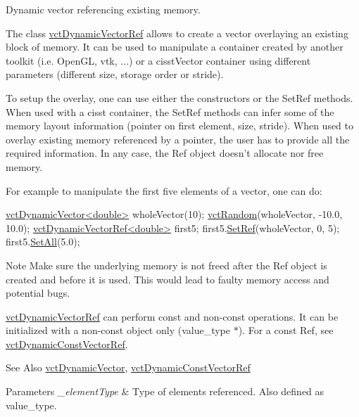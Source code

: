 Dynamic vector referencing existing memory. 

The class \hyperlink{classvct_dynamic_vector_ref}{vct\-Dynamic\-Vector\-Ref} allows to create a vector overlaying an existing block of memory. It can be used to manipulate a container created by another toolkit (i.\-e. Open\-G\-L, vtk, ...) or a cisst\-Vector container using different parameters (different size, storage order or stride).

To setup the overlay, one can use either the constructors or the Set\-Ref methods. When used with a cisst container, the Set\-Ref methods can infer some of the memory layout information (pointer on first element, size, stride). When used to overlay existing memory referenced by a pointer, the user has to provide all the required information. In any case, the Ref object doesn't allocate nor free memory.

For example to manipulate the first five elements of a vector, one can do\-: 
\begin{DoxyCode}
\hyperlink{classvct_dynamic_vector}{vctDynamicVector<double>} wholeVector(10);
\hyperlink{group__cisst_vector_ga0d25660a2dc6ef9c093f6f6b2804d2d0}{vctRandom}(wholeVector, -10.0, 10.0);
\hyperlink{classvct_dynamic_vector_ref}{vctDynamicVectorRef<double>} first5;
first5.\hyperlink{classvct_dynamic_vector_ref_aafa4ebcfe74bf97ca55f902f8864722f}{SetRef}(wholeVector, 0, 5);
first5.\hyperlink{classvct_dynamic_vector_base_a0cf13429dcd83b565c3cbd7e30ecdec7}{SetAll}(5.0);
\end{DoxyCode}


\begin{DoxyNote}{Note}
Make sure the underlying memory is not freed after the Ref object is created and before it is used. This would lead to faulty memory access and potential bugs.

\hyperlink{classvct_dynamic_vector_ref}{vct\-Dynamic\-Vector\-Ref} can perform const and non-\/const operations. It can be initialized with a non-\/const object only ({\ttfamily value\-\_\-type $\ast$}). For a const Ref, see \hyperlink{classvct_dynamic_const_vector_ref}{vct\-Dynamic\-Const\-Vector\-Ref}.
\end{DoxyNote}
\begin{DoxySeeAlso}{See Also}
\hyperlink{classvct_dynamic_vector}{vct\-Dynamic\-Vector}, \hyperlink{classvct_dynamic_const_vector_ref}{vct\-Dynamic\-Const\-Vector\-Ref}
\end{DoxySeeAlso}

\begin{DoxyParams}{Parameters}
{\em \-\_\-element\-Type} & Type of elements referenced. Also defined as {\ttfamily value\-\_\-type}. \\
\hline
\end{DoxyParams}


